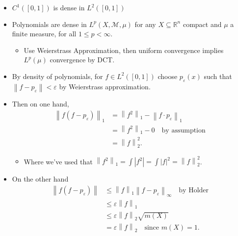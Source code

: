 \begin{solution}
\hfill

\begin{concept}

\hfill

\begin{itemize}
\tightlist
\item
  \(C^1([0, 1])\) is dense in \(L^2([0, 1])\)
\item
  Polynomials are dense in \(L^p(X, \mathcal{M}, \mu)\) for any
  \(X\subseteq {\mathbb{R}}^n\) compact and \(\mu\) a finite measure,
  for all \(1\leq p < \infty\).

  \begin{itemize}
  \tightlist
  \item
    Use Weierstrass Approximation, then uniform convergence implies
    \(L^p(\mu)\) convergence by DCT.
  \end{itemize}
\end{itemize}

\end{concept}

\begin{itemize}
\item
  By density of polynomials, for \(f\in L^2([0, 1])\) choose
  \(p_\varepsilon(x)\) such that
  \({\left\lVert {f - p_\varepsilon} \right\rVert} < \varepsilon\) by
  Weierstrass approximation.
\item
  Then on one hand,
  \begin{align*}
  {\left\lVert {f(f-p_\varepsilon)} \right\rVert}_1 
  &= {\left\lVert {f^2} \right\rVert}_1 - {\left\lVert {f\cdot p_\varepsilon} \right\rVert}_1 \\
  &= {\left\lVert {f^2} \right\rVert}_1 - 0 \quad\text{by assumption} \\
  &= {\left\lVert {f} \right\rVert}_2^2
  .\end{align*}

  \begin{itemize}
  \tightlist
  \item
    Where we've used that
    \({\left\lVert {f^2} \right\rVert}_1 = \int {\left\lvert {f^2} \right\rvert} = \int {\left\lvert {f} \right\rvert}^2 = {\left\lVert {f} \right\rVert}_2^2\).
  \end{itemize}
\item
  On the other hand
  \begin{align*}
  {\left\lVert {f(f-p_\varepsilon)} \right\rVert} 
  &\leq {\left\lVert {f} \right\rVert}_1 {\left\lVert {f-p_\varepsilon} \right\rVert}_\infty \quad\text{by Holder} \\
  &\leq \varepsilon{\left\lVert {f} \right\rVert}_1  \\
  &\leq \varepsilon{\left\lVert {f} \right\rVert}_2 \sqrt{m(X)} \\ 
  &= \varepsilon{\left\lVert {f} \right\rVert}_2 \quad\text{since } m(X)= 1
  .\end{align*}


\end{itemize}
\end{solution}

